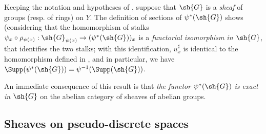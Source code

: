 \begin{env}[3.7.2]
\label{0.3.7.2}
Keeping the notation and hypotheses of , suppose that $\sh{G}$
is a \emph{sheaf} of groups (resp. of rings) on $Y$. The definition of sections
of $\psi^*(\sh{G})$  shows (considering  that
the homomorphism of stalks
$\psi_x\circ\rho_{\psi(x)}:\sh{G}_{\psi(x)}\to(\psi^*(\sh{G}))_x$ is a
\emph{functorial isomorphism in $\sh{G}$}, that identifies the two stalks; with
this identification, $u_x^\sharp$ is identical to the homomorphism defined in
, and in particular, we have
$\Supp(\psi^*(\sh{G}))=\psi^{-1}(\Supp(\sh{G}))$.

An immediate consequence of this result is that \emph{the functor
$\psi^*(\sh{G})$ is exact in $\sh{G}$} on the abelian category of sheaves of
abelian groups.
\end{env}

\subsection{Sheaves on pseudo-discrete spaces}
\label{subsection:sheaves-on-pseudo-discrete-spaces}

